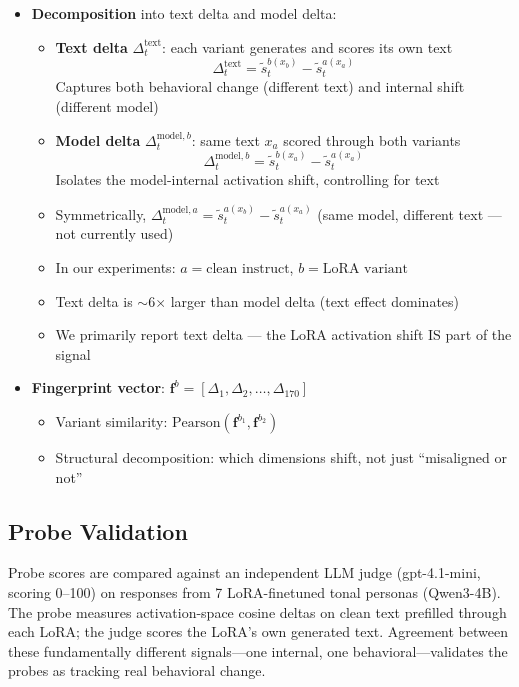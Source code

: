 \documentclass[11pt]{article}
\begin{document}
\begin{itemize}
  \item \textbf{Decomposition} into text delta and model delta:
  \begin{itemize}
    \item \textbf{Text delta} $\Delta_t^{\text{text}}$: each variant generates and scores its own text
    \begin{equation}
      \Delta_t^{\text{text}} = \tilde{s}_t^{b(x_b)} - \tilde{s}_t^{a(x_a)}
    \end{equation}
    Captures both behavioral change (different text) and internal shift (different model)
    \item \textbf{Model delta} $\Delta_t^{\text{model},b}$: same text $x_a$ scored through both variants
    \begin{equation}
      \Delta_t^{\text{model},b} = \tilde{s}_t^{b(x_a)} - \tilde{s}_t^{a(x_a)}
    \end{equation}
    Isolates the model-internal activation shift, controlling for text
    \item Symmetrically, $\Delta_t^{\text{model},a} = \tilde{s}_t^{a(x_b)} - \tilde{s}_t^{a(x_a)}$ (same model, different text --- not currently used)
    \item In our experiments: $a = \text{clean instruct}$, $b = \text{LoRA variant}$
    \item Text delta is $\sim$6$\times$ larger than model delta (text effect dominates)
    \item We primarily report text delta --- the LoRA activation shift IS part of the signal
  \end{itemize}

  \item \textbf{Fingerprint vector}: $\mathbf{f}^{b} = [\Delta_1, \Delta_2, \ldots, \Delta_{170}]$
  \begin{itemize}
    \item Variant similarity: $\text{Pearson}(\mathbf{f}^{b_1}, \mathbf{f}^{b_2})$
    \item Structural decomposition: which dimensions shift, not just ``misaligned or not''
  \end{itemize}
\end{itemize}


\subsection{Probe Validation}

Probe scores are compared against an independent LLM judge (gpt-4.1-mini, scoring 0--100) on responses from 7 LoRA-finetuned tonal personas (Qwen3-4B). The probe measures activation-space cosine deltas on clean text prefilled through each LoRA; the judge scores the LoRA's own generated text. Agreement between these fundamentally different signals---one internal, one behavioral---validates the probes as tracking real behavioral change.
\end{document}
